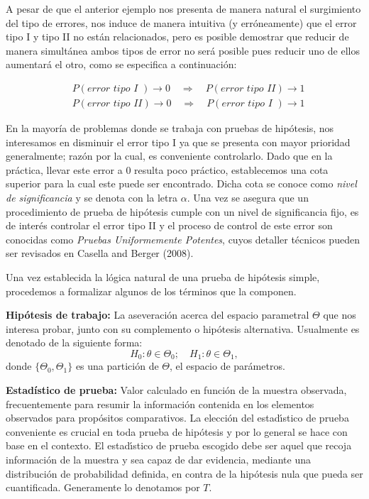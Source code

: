 \documentclass{article}
\theoremstyle{definition}
\begin{document}
A pesar de que el anterior ejemplo nos presenta de manera natural el surgimiento del tipo de errores, nos induce de manera intuitiva (y erróneamente) que el error tipo I y tipo II no están relacionados, pero es posible demostrar que reducir de manera simultánea ambos tipos de error no será posible pues reducir uno de
ellos aumentará el otro, como se especifica a continuación:

\begin{align*}
	&P(\textit{error tipo I })\to0\quad \Longrightarrow \quad P(\textit{error tipo II} )\to 1\\
	&P(\textit{error tipo II})\to0 \quad\Longrightarrow \quad P(\textit{error tipo I } )\to 1
\end{align*}

En la mayoría de problemas donde se trabaja con pruebas de hipótesis, nos interesamos en disminuir el error tipo I ya que se presenta con mayor prioridad generalmente; razón por la cual, es conveniente controlarlo. Dado que en la práctica, llevar este error a 0 resulta poco práctico, establecemos una cota superior para la cual este puede ser encontrado. Dicha cota se conoce como \textit{nivel de significancia} y se denota con la letra $\alpha$.  Una vez se asegura que un procedimiento de prueba de hipótesis cumple con un nivel de significancia fijo, es de interés controlar el error tipo II y el proceso de control de este error son conocidas como \textit{Pruebas Uniformemente Potentes}, cuyos detaller técnicos pueden ser revisados en Casella and Berger (2008).

Una vez establecida la lógica natural de una prueba de hipótesis simple, procedemos a formalizar algunos de los términos que la componen.

\textbf{Hipótesis de trabajo:} La aseveración acerca del espacio parametral $\Theta$ que nos interesa probar,
junto con su complemento o hipótesis alternativa. Usualmente es denotado de la siguiente forma:
$$H_0:\theta\in\Theta_0; \quad H_1: \theta\in\Theta_1,$$
donde $\{\Theta_0,\Theta_1\}$ es una partición de $\Theta$, el espacio de parámetros.

\textbf{Estadístico de prueba:} Valor calculado en función de la muestra observada, frecuentemente
para resumir la información contenida en los elementos observados para propósitos comparativos.
La elección del estadı́stico de prueba conveniente es crucial en toda prueba de hipótesis y por lo
general se hace con base en el contexto. El estadı́stico de prueba escogido debe ser aquel que recoja
información de la muestra y sea capaz de dar evidencia, mediante una distribución de probabilidad
definida, en contra de la hipótesis nula que pueda ser cuantificada. Generamente lo denotamos por $T$.
\end{document}
